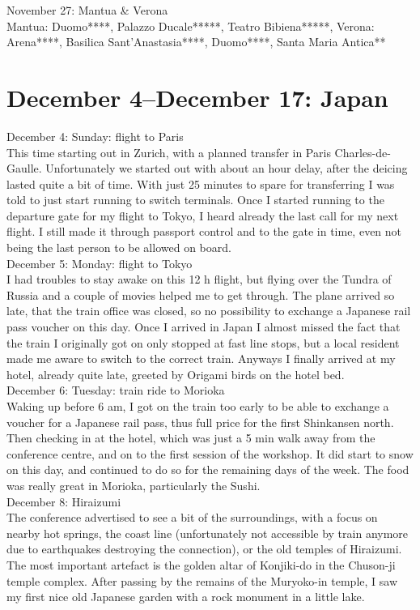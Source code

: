 November 27: Mantua \& Verona\\
Mantua: Duomo****, Palazzo Ducale*****, Teatro Bibiena*****, Verona: Arena****, Basilica Sant'Anastasia****, Duomo****, Santa Maria Antica**

\section{December 4--December 17: Japan}
\label{Japan2016}

December 4: Sunday: flight to Paris\\
This time starting out in Zurich, with a planned transfer in Paris Charles-de-Gaulle. Unfortunately we started out with about an hour delay, after the deicing lasted quite a bit of time. With just 25 minutes to spare for transferring I was told to just start running to switch terminals. Once I started running to the departure gate for my flight to Tokyo, I heard already the last call for my next flight. I still made it through passport control and to the gate in time, even not being the last person to be allowed on board.\\

December 5: Monday: flight to Tokyo\\
I had troubles to stay awake on this 12 h flight, but flying over the Tundra of Russia and a couple of movies helped me to get through. The plane arrived so late, that the train office was closed, so no possibility to exchange a Japanese rail pass voucher on this day. Once I arrived in Japan I almost missed the fact that the train I originally got on only stopped at fast line stops, but a local resident made me aware to switch to the correct train. Anyways I finally arrived at my hotel, already quite late, greeted by Origami birds on the hotel bed.\\

December 6: Tuesday: train ride to Morioka\\
Waking up before 6 am, I got on the train too early to be able to exchange a voucher for a Japanese rail pass, thus full price for the first Shinkansen north. Then checking in at the hotel, which was just a 5 min walk away from the conference centre, and on to the first session of the workshop. It did start to snow on this day, and continued to do so for the remaining days of the week. The food was really great in Morioka, particularly the Sushi.\\

December 8: Hiraizumi\\
The conference advertised to see a bit of the surroundings, with a focus on nearby hot springs, the coast line (unfortunately not accessible by train anymore due to earthquakes destroying the connection), or the old temples of Hiraizumi. The most important artefact is the golden altar of Konjiki-do in the Chuson-ji temple complex. After passing by the remains of the Muryoko-in temple, I saw my first nice old Japanese garden with a rock monument in a little lake.\\

